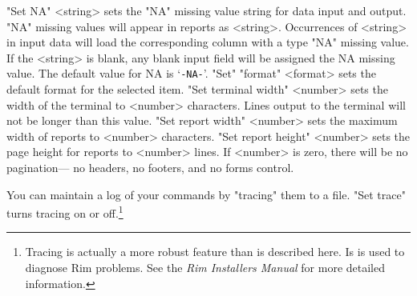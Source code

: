  
%
\<"Set NA" <string>\>
sets the "NA" missing value string for data input and output.
"NA" missing values will appear in reports as <string>.
Occurrences of <string> in input data will load the corresponding
column with a type "NA" missing value.
If the <string> is blank, any blank input field will
be assigned the NA missing value.
The default value for NA is `{\tt-NA-}'.
%
\<"Set" 
 "format" <format>\>
sets the default format for the selected item.
%
\<"Set terminal width" <number>\>
sets the width of the terminal to <number> characters.
Lines output to the terminal will not be longer than this value.
%
\<"Set report width" <number>\>
sets the maximum width of reports to <number> characters.
\label{set-height}
\<"Set report height" <number>\>
sets the page height for reports to <number> lines.
If <number> is zero, there will be no pagination---%
no headers, no footers, and no forms control.
 
\label{set-trace}
You can maintain a log of your commands by "tracing" them to
a file.
\<"Set trace" \>
turns tracing on or off.\footnote{Tracing is actually a more
robust feature than is described here.  Is is used to
diagnose Rim problems.  See the {\it Rim Installers Manual}
for more detailed information.}



